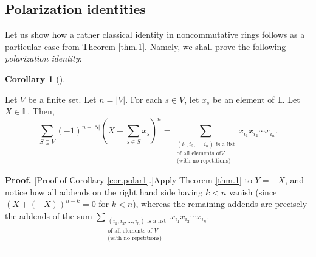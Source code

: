 \documentclass[numbers=enddot,12pt,final,onecolumn,notitlepage]{scrartcl}%
\theoremstyle{definition}
\newtheorem{coro}[theo]{Corollary}
\newenvironment{corollary}[1][]
{\begin{coro}[#1]\begin{leftbar}}
{\end{leftbar}\end{coro}}
\newenvironment{proof}[1][Proof]{\noindent\textbf{#1.} }{\ \rule{0.5em}{0.5em}}
\let\sumnonlimits\sum
\renewcommand{\sum}{\sumnonlimits\limits}
\newenvironment{vershort}{}{}
\begin{document}
\subsection{Polarization identities}

Let us show how a rather classical identity in noncommutative rings follows as
a particular case from Theorem \ref{thm.1}. Namely, we shall prove the
following \textit{polarization identity}:

\begin{corollary}
\label{cor.polar1}Let $V$ be a finite set. Let $n=\left\vert V\right\vert $.
For each $s\in V$, let $x_{s}$ be an element of $\mathbb{L}$. Let
$X\in\mathbb{L}$. Then,%
\[
\sum_{S\subseteq V}\left(  -1\right)  ^{n-\left\vert S\right\vert }\left(
X+\sum_{s\in S}x_{s}\right)  ^{n}=\sum_{\substack{\left(  i_{1},i_{2}%
,\ldots,i_{n}\right)  \text{ is a list}\\\text{of all elements of
}V\\\text{(with no repetitions)}}}x_{i_{1}}x_{i_{2}}\cdots x_{i_{n}}.
\]

\end{corollary}

\begin{vershort}
\begin{proof}
[Proof of Corollary \ref{cor.polar1}.]Apply Theorem \ref{thm.1} to $Y=-X$, and
notice how all addends on the right hand side having $k<n$ vanish (since
$\left(  X+\left(  -X\right)  \right)  ^{n-k}=0$ for $k<n$), whereas the
remaining addends are precisely the addends of the sum \newline$\sum
_{\substack{\left(  i_{1},i_{2},\ldots,i_{n}\right)  \text{ is a
list}\\\text{of all elements of }V\\\text{(with no repetitions)}}}x_{i_{1}%
}x_{i_{2}}\cdots x_{i_{n}}$.
\end{proof}
\end{vershort}
\end{document}
